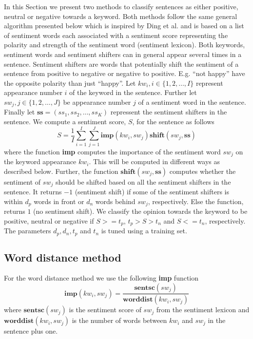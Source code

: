 \documentclass[11pt]{article}
\begin{document}
In this Section we present two methods to classify sentences as either positive, neutral or negative towards a keyword. Both methods follow the same general algorithm presented below which is inspired by Ding et al.  and is based on a list of sentiment words each associated with a sentiment score representing the polarity and strength of the sentiment word (sentiment lexicon). Both keywords, sentiment words and sentiment shifters can in general appear several times in a sentence. Sentiment shifters are words that potentially shift the sentiment of a sentence from positive to negative or negative to positive. E.g. ``not happy'' have the opposite polarity than just ``happy''. Let $kw_i, i \in \{1,2,\ldots,I\}$ represent appearance number $i$ of the keyword in the sentence. Further let $sw_{j}, j \in \{1,2,\ldots,J\}$ be appearance number $j$ of a sentiment word in the sentence. Finally let $\textbf{ss} = (ss_1, ss_2, \ldots, ss_K)$ repressent the sentiment shifters in the sentence. We compute a sentiment score, $S$, for the sentence as follows
\begin{equation}
  \label{eq:1}
  S = \frac{1}{I}\sum_{i=1}^{I} \sum_{j=1}^{J} \mathbf{imp}(kw_i, sw_{j})\mathbf{shift}(sw_{j}, \mathbf{ss})    
\end{equation}
where the function \textbf{imp} computes the importance of the sentiment word $sw_{j}$ on the keyword appearance $kw_i$. This will be computed in different ways as described below. Further, the function $\mathbf{shift}(sw_{j}, \mathbf{ss})$ computes whether the sentiment of $sw_{j}$ should be shifted based on all the sentiment shifters in the sentence. It returns $-1$ (sentiment shift) if some of the sentiment shifters is within $d_{p}$ words in front or $d_{n}$ words behind $sw_{j}$, respectively. Else the function, returns $1$ (no sentiment shift). We classify the opinion towards the keyword to be positive, neutral or negative if $S >= t_p$,  $t_p > S > t_n$ and  $S <= t_n$, respectively. The parameters $d_p, d_n, t_p$ and $t_n$ is tuned using a training set.

\subsection{Word distance method}
\label{sec:wd}

For the word distance method we use the following \textbf{imp} function
\begin{equation}
  \label{eq:2}
  \mathbf{imp}(kw_i, sw_{j}) = \frac{\mathbf{sentsc}(sw_{j})}{\mathbf{worddist}(kw_i, sw_{j})}
\end{equation}
where $\mathbf{sentsc}(sw_{j})$ is the sentiment score of $sw_{j}$ from the sentiment lexicon and $\mathbf{worddist}(kw_i, sw_{j})$ is the number of words between $kw_i$ and $sw_{j}$ in the sentence plus one.
\end{document}

